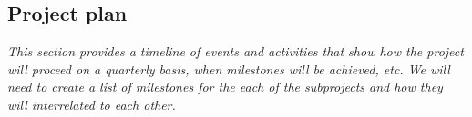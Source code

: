 
\subsection{Project plan}

{\em This section provides a timeline of events and activities that show how the project will proceed on a quarterly basis, when milestones will be achieved, etc.  We will need to create a list of milestones for the each of the subprojects and how they will 
interrelated to each other.
}



